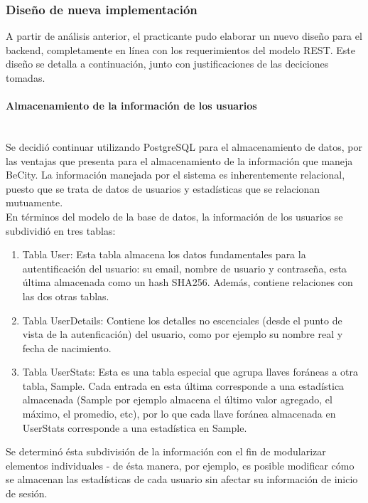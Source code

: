 \documentclass[11pt,letterpaper]{article}
\begin{document}
\subsubsection{Diseño de nueva implementación}

A partir de análisis anterior, el practicante pudo elaborar un nuevo diseño para el backend, completamente en línea con los requerimientos del modelo REST. Este diseño se detalla a continuación, junto con justificaciones de las deciciones tomadas.

\paragraph{Almacenamiento de la información de los usuarios\\\\}
Se decidió continuar utilizando PostgreSQL para el almacenamiento de datos, por las ventajas que presenta para el almacenamiento de la información que maneja BeCity. La información manejada por el sistema es inherentemente relacional, puesto que se trata de datos de usuarios y estadísticas que se relacionan mutuamente.\\

En términos del modelo de la base de datos, la información de los usuarios se subdividió en tres tablas:
\begin{enumerate}
    \item Tabla User: Esta tabla almacena los datos fundamentales para la autentificación del usuario: su email, nombre de usuario y contraseña, esta última almacenada como un hash SHA256. Además, contiene relaciones con las dos otras tablas.
    \item Tabla UserDetails: Contiene los detalles no escenciales (desde el punto de vista de la autenficación) del usuario, como por ejemplo su nombre real y fecha de nacimiento.
    \item Tabla UserStats: Esta es una tabla especial que agrupa llaves foráneas a otra tabla, Sample. Cada entrada en esta última corresponde a una estadística almacenada (Sample por ejemplo almacena el último valor agregado, el máximo, el promedio, etc), por lo que cada llave foránea almacenada en UserStats corresponde a una estadística en Sample.
\end{enumerate}

Se determinó ésta subdivisión de la información con el fin de modularizar elementos individuales - de ésta manera, por ejemplo, es posible modificar cómo se almacenan las estadísticas de cada usuario sin afectar su información de inicio de sesión.
\end{document}

